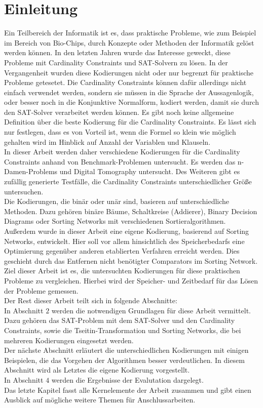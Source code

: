 \documentclass[a4,abstract=on]{scrartcl}
\newcommand*\stdsection{}
\let\stdsection\section
\renewcommand*\section{%
    \clearpage\ifodd\value{page}\else\mbox{}\clearpage\fi
    \stdsection}
\begin{document}
\section{Einleitung}
Ein Teilbereich der Informatik ist es, dass praktische Probleme, wie zum Beispiel im Bereich von Bio-Chips, durch Konzepte oder Methoden der Informatik gelöst werden können.
In den letzten Jahren wurde das Interesse geweckt, diese Probleme mit Cardinality Constraints und SAT-Solvern zu lösen. In der Vergangenheit wurden diese Kodierungen nicht oder nur begrenzt für praktische Probleme getesetet. Die Cardinality Constraints können dafür allerdings nicht einfach verwendet werden, sondern sie müssen in die Sprache der Aussagenlogik, oder besser noch in die Konjunktive Normalform, kodiert werden, damit sie durch den SAT-Solver verarbeitet werden können. Es gibt noch keine allgemeine Definition über die beste Kodierung für die Cardinality Constraints. Es lässt sich nur festlegen, dass es von Vorteil ist, wenn die Formel so klein wie möglich gehalten wird im Hinblick auf Anzahl der Variablen und Klauseln.\\
In dieser Arbeit werden daher verschiedene Kodierungen für die Cardinality Constraints anhand von Benchmark-Problemen untersucht. Es werden das n-Damen-Problems und Digital Tomography untersucht. Des Weiteren gibt es zufällig generierte Testfälle, die Cardinality Constraints unterschiedlicher Größe untersuchen. \\
Die Kodierungen, die binär oder unär sind, basieren auf unterschiedliche Methoden. Dazu gehören binäre Bäume, Schaltkreise (Addierer), Binary Decision Diagrams oder Sorting Networks mit verschiedenen Sortieralgorithmen. \\
Außerdem wurde in dieser Arbeit eine eigene Kodierung, basierend auf Sorting Networks, entwickelt. Hier soll vor allem hinsichtlich des Speicherbedarfs eine Optimierung gegenüber anderen etablierten Verfahren erreicht werden. Dies geschieht durch das Entfernen nicht benötigter Comparators im Sorting Network. \\
Ziel dieser Arbeit ist es, die untersuchten Kodierungen für diese praktischen Probleme zu vergleichen. Hierbei wird der Speicher- und Zeitbedarf für das Lösen der Probleme gemessen. \\
\newline
Der Rest dieser Arbeit teilt sich in folgende Abschnitte:\\
In Abschnitt $2$ werden die notwendigen Grundlagen für diese Arbeit vermittelt. Dazu gehören das SAT-Problem mit dem SAT-Solver und den Cardinality Constraints, sowie die Tseitin-Transformation und Sorting Networks, die bei mehreren Kodierungen eingesetzt werden.\\
Der nächste Abschnitt erläutert die unterschiedlichen Kodierungen mit einigen Beispielen, die das Vorgehen der Algorithmen besser verdeutlichen. In diesem Abschnitt wird als Letztes die eigene Kodierung vorgestellt.\\
In Abschnitt $4$ werden die Ergebnisse der Evalutation dargelegt. \\
Das letzte Kapitel fasst alle Kernelemente der Arbeit zusammen und gibt einen Ausblick auf mögliche weitere Themen für Anschlussarbeiten.
\end{document}
